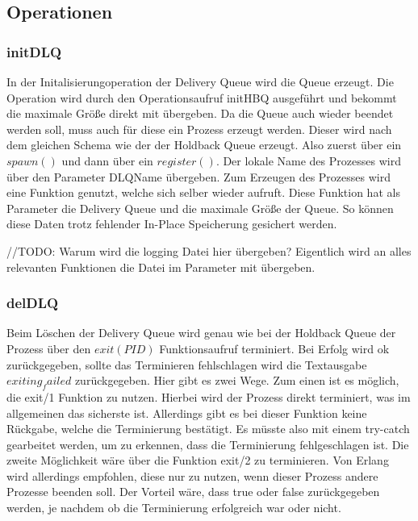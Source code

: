 \subsection{Operationen}

\subsubsection{initDLQ}

In der Initalisierungoperation der Delivery Queue wird die Queue erzeugt. Die Operation wird durch den Operationsaufruf initHBQ ausgeführt und bekommt die maximale Größe direkt mit übergeben. 
Da die Queue auch wieder beendet werden soll, muss auch für diese ein Prozess erzeugt werden. Dieser wird nach dem gleichen Schema wie der der Holdback Queue erzeugt. Also zuerst über ein $spawn()$ und dann über ein $register()$. Der lokale Name des Prozesses wird über den Parameter DLQName übergeben. Zum Erzeugen des Prozesses wird eine Funktion genutzt, welche sich selber wieder aufruft. Diese Funktion hat als Parameter die Delivery Queue und die maximale Größe der Queue. So können diese Daten trotz fehlender In-Place Speicherung gesichert werden. 

//TODO: 
Warum wird die logging Datei hier übergeben? Eigentlich wird an alles relevanten Funktionen die Datei im Parameter mit übergeben. 

\subsubsection{delDLQ}

Beim Löschen der Delivery Queue wird genau wie bei der Holdback Queue der Prozess über den $exit(PID)$ Funktionsaufruf terminiert. Bei Erfolg wird ok zurückgegeben, sollte das Terminieren fehlschlagen wird die Textausgabe $exiting_failed$ zurückgegeben. Hier gibt es zwei Wege. Zum einen ist es möglich, die exit/1 Funktion zu nutzen. Hierbei wird der Prozess direkt terminiert, was im allgemeinen das sicherste ist. Allerdings gibt es bei dieser Funktion keine Rückgabe, welche die Terminierung bestätigt. Es müsste also mit einem try-catch gearbeitet werden, um zu erkennen, dass die Terminierung fehlgeschlagen ist. 
Die zweite Möglichkeit wäre über die Funktion exit/2 zu terminieren. Von Erlang wird allerdings empfohlen, diese nur zu nutzen, wenn dieser Prozess andere Prozesse beenden soll. Der Vorteil wäre, dass true oder false zurückgegeben werden, je nachdem ob die Terminierung erfolgreich war oder nicht. 

